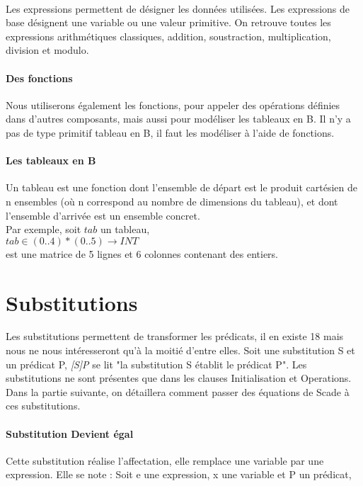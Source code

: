 \paragraph{}
Les expressions permettent de désigner les données utilisées. Les
expressions de base désignent une variable ou une valeur primitive.
On retrouve toutes les expressions arithmétiques classiques, addition,
soustraction, multiplication, division et modulo.

\paragraph{Des fonctions}

Nous utiliserons également les fonctions, pour appeler des opérations
définies dans d'autres composants, mais aussi pour modéliser les
tableaux en B. Il n'y a pas de type primitif tableau en B, il faut les
modéliser à l'aide de fonctions.

\paragraph{Les tableaux en B}
Un tableau est une fonction dont l'ensemble de départ est le produit
cartésien de n ensembles (où n correspond au nombre de dimensions du
tableau), et dont l'ensemble d'arrivée est un ensemble concret.\\
Par exemple, soit $tab$ un tableau, \\
$tab \in (0..4)*(0..5) \rightarrow INT$ \\
est une matrice de 5 lignes et 6 colonnes contenant des entiers.



\section{Substitutions}
Les substitutions permettent de transformer les prédicats, il en existe 18 mais
nous ne nous intéresseront qu'à la moitié d'entre elles. Soit une substitution S et un
prédicat P, \emph{[S]P} se lit "la substitution S établit le prédicat P".
Les substitutions ne sont présentes que dans les clauses Initialisation et
Operations. Dans la partie suivante, on détaillera comment passer des équations
de Scade à ces substitutions.


\paragraph{Substitution Devient égal}
Cette substitution réalise l'affectation, elle remplace une variable
par une expression. Elle se note : Soit e une expression, x une
variable et P un prédicat,


